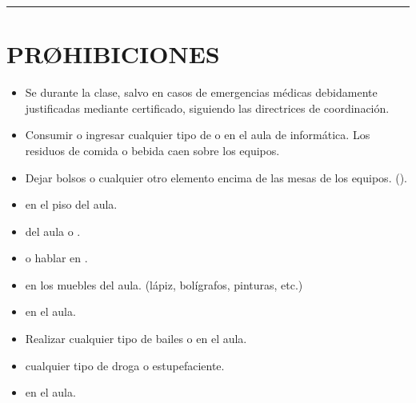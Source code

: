\documentclass[letterpaper,10pt,spanish]{sphinxmanual}
\begin{document}
\bigskip\hrule\bigskip



\section{PRØHIBICIONES}
\label{\detokenize{0_intro/reglas:prohibiciones}}\begin{itemize}
\item {} 
\sphinxAtStartPar
Se  durante la clase, salvo en casos de emergencias médicas debidamente justificadas mediante certificado, siguiendo las directrices de coordinación.

\item {} 
\sphinxAtStartPar
Consumir o ingresar cualquier tipo de  o  en el aula de informática. Los residuos de comida o bebida caen sobre los equipos.

\item {} 
\sphinxAtStartPar
Dejar bolsos o cualquier otro elemento encima de las mesas de los equipos. ().

\item {} 
\sphinxAtStartPar
{} en el piso del aula.

\item {} 
\sphinxAtStartPar
{} del aula o .

\item {} 
\sphinxAtStartPar
{} o hablar en .

\item {} 
\sphinxAtStartPar
{} en los muebles del aula. (lápiz, bolígrafos, pinturas, etc.)

\item {} 
\sphinxAtStartPar
{} en el aula.

\item {} 
\sphinxAtStartPar
Realizar cualquier tipo de bailes o  en el aula.

\item {} 
\sphinxAtStartPar
{} cualquier tipo de droga o estupefaciente.

\item {} 
\sphinxAtStartPar
{} en el aula.


\end{itemize}
\end{document}
